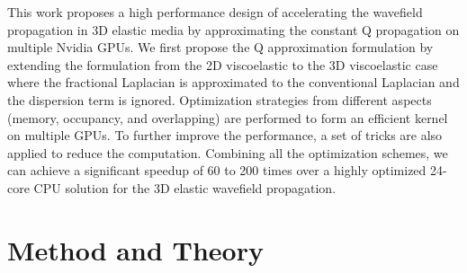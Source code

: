\documentclass{paris17}
\begin{document}
This work proposes a high performance design of accelerating the wavefield propagation in 3D elastic media by approximating the constant Q propagation on multiple Nvidia GPUs. We first propose the Q approximation formulation by extending the formulation from the 2D viscoelastic to the 3D viscoelastic case where the fractional Laplacian is approximated to the conventional Laplacian and the dispersion term is ignored.  Optimization strategies from different aspects (memory, occupancy, and overlapping) are performed to form an efficient kernel on multiple GPUs. To further improve the performance, a set of tricks are also applied to reduce the computation. Combining all the optimization schemes, we can achieve a significant speedup of 60 to 200 times over a highly optimized 24-core CPU solution for the 3D elastic wavefield propagation.

\section{Method and Theory}





\end{document}
